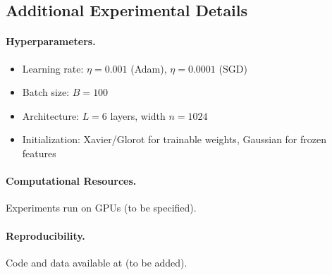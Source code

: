 \subsection{Additional Experimental Details}

\paragraph{Hyperparameters.}
\begin{itemize}
    \item Learning rate: $\eta = 0.001$ (Adam), $\eta = 0.0001$ (SGD)
    \item Batch size: $B = 100$
    \item Architecture: $L = 6$ layers, width $n = 1024$
    \item Initialization: Xavier/Glorot for trainable weights, Gaussian for frozen features
\end{itemize}

\paragraph{Computational Resources.}
Experiments run on GPUs (to be specified).

\paragraph{Reproducibility.}
Code and data available at (to be added).
